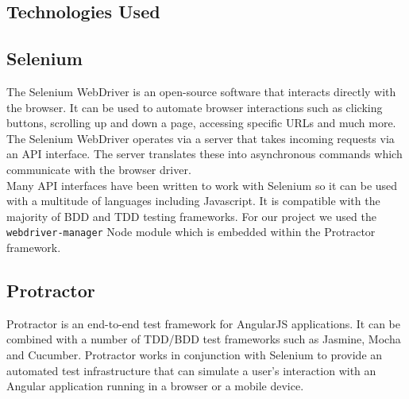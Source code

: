 %
%

\subsection{Technologies Used}
\label{sec:technologies-used}

\subsection{Selenium}
\label{subsec:selenium}
The Selenium WebDriver is an open-source software that interacts directly with the browser. It can be used to automate browser interactions such as clicking buttons, scrolling up and down a page, accessing specific URLs and much more.
\\

The Selenium WebDriver operates via a server that takes incoming requests via an API interface. The server translates these into asynchronous commands which communicate with the browser driver. 
\\

Many API interfaces have been written to work with Selenium so it can be used with a multitude of languages including Javascript. It is compatible with the majority of BDD and TDD testing frameworks. For our project we used the \texttt{webdriver-manager} Node module which is embedded within the Protractor framework.

\subsection{Protractor}
\label{subsec:protractor}
Protractor is an end-to-end test framework for AngularJS applications. It can be combined with a number of TDD/BDD test frameworks such as Jasmine, Mocha and Cucumber. Protractor works in conjunction with Selenium to provide an automated test infrastructure that can simulate a user’s interaction with an Angular application running in a browser or a mobile device.
\\

